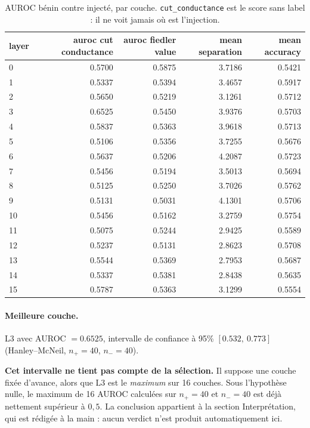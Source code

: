 \documentclass[11pt,a4paper]{article}
\begin{document}
\begin{table}[htbp]
\centering
\small
\begin{tabular}{lrrrr}
\hline
layer & auroc cut conductance & auroc fiedler value & mean separation & mean accuracy \\
\hline
0 & 0.5700 & 0.5875 & 3.7186 & 0.5421 \\
1 & 0.5337 & 0.5394 & 3.4657 & 0.5917 \\
2 & 0.5650 & 0.5219 & 3.1261 & 0.5712 \\
3 & 0.6525 & 0.5450 & 3.9376 & 0.5703 \\
4 & 0.5837 & 0.5363 & 3.9618 & 0.5713 \\
5 & 0.5106 & 0.5356 & 3.7255 & 0.5676 \\
6 & 0.5637 & 0.5206 & 4.2087 & 0.5723 \\
7 & 0.5456 & 0.5194 & 3.5013 & 0.5694 \\
8 & 0.5125 & 0.5250 & 3.7026 & 0.5762 \\
9 & 0.5131 & 0.5031 & 4.1301 & 0.5706 \\
10 & 0.5456 & 0.5162 & 3.2759 & 0.5754 \\
11 & 0.5075 & 0.5244 & 2.9425 & 0.5589 \\
12 & 0.5237 & 0.5131 & 2.8623 & 0.5708 \\
13 & 0.5544 & 0.5369 & 2.7953 & 0.5687 \\
14 & 0.5337 & 0.5381 & 2.8438 & 0.5635 \\
15 & 0.5787 & 0.5363 & 3.1299 & 0.5554 \\
\hline
\end{tabular}
\caption{AUROC bénin contre injecté, par couche. \texttt{cut\_conductance} est le score sans label : il ne voit jamais où est l'injection.}
\label{tab:layers}
\end{table}


\paragraph{Meilleure couche.} L3 avec
AUROC $= 0.6525$, intervalle de confiance à 95\%
$[0.532,\ 0.773]$ (Hanley--McNeil, $n_+ = 40$, $n_- = 40$).



\textbf{Cet intervalle ne tient pas compte de la sélection.} Il suppose une
couche fixée d'avance, alors que L3 est le \emph{maximum} sur
16 couches. Sous l'hypothèse nulle, le maximum de
16 AUROC calculées sur $n_+ = 40$ et $n_- = 40$ est déjà
nettement supérieur à $0{,}5$. La conclusion appartient à la section
Interprétation, qui est rédigée à la main : aucun verdict n'est produit
automatiquement ici.
\end{document}

